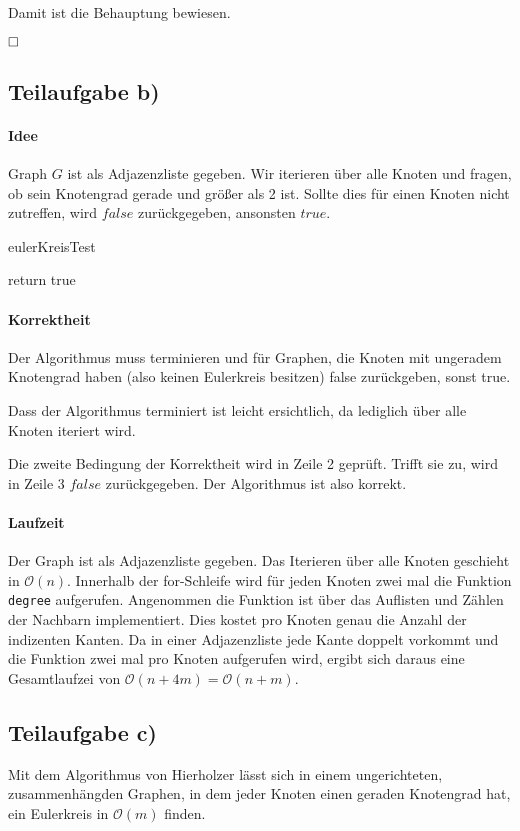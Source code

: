\documentclass[12pt]{scrartcl}%
\theoremstyle{nonumberplain}
\newcommand{\bO}[1]{\mathcal O(#1)}
\newcommand{\code}[1]{\lstinline[basicstyle=\ttfamily\color{black}]{#1}}
\begin{document}
Damit ist die Behauptung bewiesen.

$\hfill \square$

\subsection*{Teilaufgabe b)}

\paragraph{Idee} Graph $G$ ist als Adjazenzliste gegeben. Wir iterieren über alle Knoten und fragen, ob sein Knotengrad gerade und größer als 2 ist. Sollte dies für einen Knoten nicht zutreffen, wird $false$ zurückgegeben, ansonsten $true$.

\begin{algorithm}[ht!]
	\LinesNumbered
	\caption{eulerKreisTest}
	 
	\BlankLine
	
	 {
	}
	return true\;
\end{algorithm}

\paragraph{Korrektheit}

Der Algorithmus muss terminieren und für Graphen, die Knoten mit ungeradem Knotengrad haben (also keinen Eulerkreis besitzen) false zurückgeben, sonst true. 

Dass der Algorithmus terminiert ist leicht ersichtlich, da lediglich über alle Knoten iteriert wird. 

Die zweite Bedingung der Korrektheit wird in Zeile 2 geprüft. Trifft sie zu, wird in Zeile 3 $false$ zurückgegeben. Der Algorithmus ist also korrekt.

\paragraph{Laufzeit}

Der Graph ist als Adjazenzliste gegeben. Das Iterieren über alle Knoten geschieht in $\bO{n}$. Innerhalb der for-Schleife wird für jeden Knoten zwei mal die Funktion \code{degree} aufgerufen. Angenommen die Funktion ist über das Auflisten und Zählen der Nachbarn implementiert. Dies kostet pro Knoten genau die Anzahl der indizenten Kanten. Da in einer Adjazenzliste jede Kante doppelt vorkommt und die Funktion zwei mal pro Knoten aufgerufen wird, ergibt sich daraus eine Gesamtlaufzei von $\bO{n+4m} = \bO{n+m}$.

\subsection*{Teilaufgabe c)}

Mit dem Algorithmus von Hierholzer lässt sich in einem ungerichteten, zusammenhängden Graphen, in dem jeder Knoten einen geraden Knotengrad hat, ein Eulerkreis in $\bO{m}$ finden.
\end{document}
